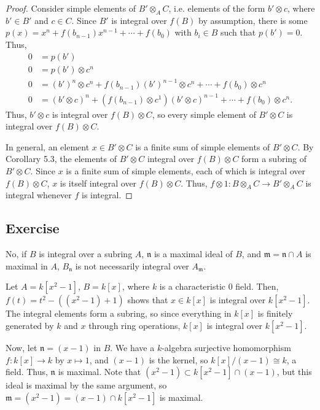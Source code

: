 \begin{proof}
Consider simple elements of $B' \otimes_A C$, i.e. elements of the form $b' \otimes c$, where $b' \in B'$ and $c \in C$. Since $B'$ is integral over $f(B)$
by assumption, there is some $p(x) = x^n + f(b_{n-1}) x^{n-1} + \cdots + f(b_0)$ with $b_i \in B$ such that $p(b') = 0$. Thus,
\begin{align*}
0 &= p(b') \\
0 &= p(b') \otimes c^n \\
0 &= (b')^n \otimes c^n + f(b_{n-1}) (b')^{n-1} \otimes c^n + \cdots + f(b_0) \otimes c^n \\
0 &= (b' \otimes c)^n + (f(b_{n-1}) \otimes c^1) (b' \otimes c)^{n-1} + \cdots + f(b_0) \otimes c^n.
\end{align*}
Thus, $b' \otimes c$ is integral over $f(B) \otimes C$, so every simple element of $B' \otimes C$ is integral over $f(B) \otimes C$.

In general, an element $x \in B' \otimes C$ is a finite sum of simple elements of $B' \otimes C$. By Corollary 5.3, the elements of
$B' \otimes C$ integral over $f(B) \otimes C$ form a subring of $B' \otimes C$. Since $x$ is a finite sum of simple elements, each of which is 
integral over $f(B) \otimes C$, $x$ is itself integral over $f(B) \otimes C$. Thus, $f \otimes 1 : B \otimes_A C \to B' \otimes_A C$ is integral
whenever $f$ is integral.
\end{proof}

\subsection{Exercise}\label{5.4}

No, if $B$ is integral over a subring $A$, $\mathfrak{n}$ is a maximal ideal of $B$, and $\mathfrak{m} = \mathfrak{n} \cap A$ is maximal in $A$, $B_{\mathfrak{n}}$
is not necessarily integral over $A_{\mathfrak{m}}$.

Let $A = k[x^2 - 1]$, $B = k[x]$, where $k$ is a characteristic $0$ field. Then, $f(t) = t^2 - ((x^2 - 1) + 1)$ shows that $x \in k[x]$ is integral over $k[x^2 - 1]$. 
The integral elements form a subring, so since everything in $k[x]$ is finitely generated by $k$ and $x$ through ring operations, $k[x]$ is integral over $k[x^2-1]$.

Now, let $\mathfrak{n} = (x-1)$ in $B$. We have a $k$-algebra surjective homomorphism $f : k[x] \to k$ by $x \mapsto 1$, and $(x-1)$ is the kernel,
so $k[x]/(x-1) \cong k$, a field. Thus, $\mathfrak{n}$ is maximal. Note that $(x^2 - 1) \subset k[x^2 - 1] \cap (x-1)$, but this ideal is maximal by 
the same argument, so $\mathfrak{m} = (x^2 - 1) = (x-1) \cap k[x^2-1]$ is maximal.

